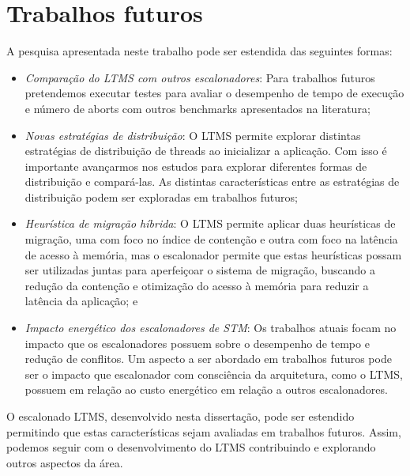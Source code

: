\documentclass[diss,capa]{texufpel}
\begin{document}
\section{\textbf{Trabalhos futuros}}

A pesquisa apresentada neste trabalho pode ser estendida das seguintes formas:

\begin{itemize}
\item \emph{Comparação do LTMS com outros escalonadores}: Para trabalhos futuros pretendemos executar testes para avaliar o desempenho de tempo de execução e número de aborts com outros benchmarks apresentados na literatura;

 \item \emph{Novas estratégias de distribuição}: O LTMS permite explorar distintas estratégias de distribuição de threads ao inicializar a aplicação. Com isso é importante avançarmos nos estudos para explorar diferentes formas de distribuição e compará-las. As distintas características entre as estratégias de distribuição podem ser exploradas em trabalhos futuros;

 \item \emph{Heurística de migração híbrida}: O LTMS permite aplicar duas heurísticas de migração, uma com foco no índice de contenção e outra com foco na latência de acesso à memória, mas o escalonador permite que estas heurísticas possam ser utilizadas juntas para aperfeiçoar o sistema de migração, buscando a redução da contenção e otimização do acesso à memória para reduzir a latência da aplicação; e

 \item \emph{Impacto energético dos escalonadores de STM}: Os trabalhos atuais focam no impacto que os escalonadores possuem sobre o desempenho de tempo e redução de conflitos. Um aspecto a ser abordado em trabalhos futuros pode ser o impacto que escalonador com consciência da arquitetura, como o LTMS, possuem em relação ao custo energético em relação a outros escalonadores.
\end{itemize}

O escalonado LTMS, desenvolvido nesta dissertação, pode ser estendido permitindo que estas características sejam avaliadas em trabalhos futuros. Assim, podemos seguir com o desenvolvimento do LTMS contribuindo e explorando outros aspectos da área.


 




\end{document}
